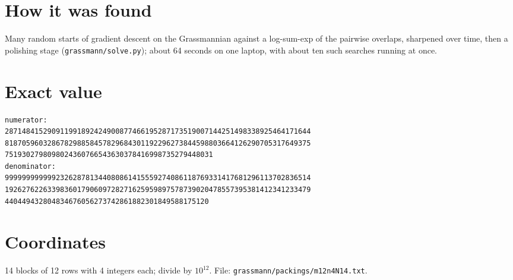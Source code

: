 \documentclass[11pt,a4paper]{article}
\begin{document}
\section{How it was found}
Many random starts of gradient descent on the Grassmannian against a log-sum-exp of the pairwise overlaps, sharpened over time, then a polishing stage (\texttt{grassmann/solve.py}); about 64 seconds on one laptop, with about ten such searches running at once.


\appendix
\section{Exact value}
{\small
\begin{verbatim}
numerator:
287148415290911991892424900877466195287173519007144251498338925464171644
818705960328678298858457829684301192296273844598803664126290705317649375
7519302798098024360766543630378416998735279448031
denominator:
999999999999232628781344080861415559274086118769331417681296113702836514
192627622633983601790609728271625959897578739020478557395381412341233479
440449432804834676056273742861882301849588175120
\end{verbatim}}

\section{Coordinates}
14 blocks of 12 rows with 4 integers each; divide by $10^{12}$. File: \texttt{grassmann/packings/m12n4N14.txt}.
{\tiny
\begin{multicols}{3}
\end{multicols}}
\end{document}
